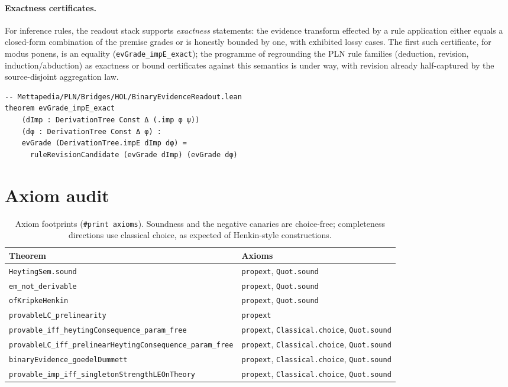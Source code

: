 \documentclass[11pt]{article}
\newcommand{\code}[1]{\texttt{#1}}
\theoremstyle{plain}
\theoremstyle{definition}
\begin{document}
\paragraph{Exactness certificates.}  For inference rules, the readout stack
supports \emph{exactness} statements: the evidence transform effected by a
rule application either equals a closed-form combination of the premise
grades or is honestly bounded by one, with exhibited lossy cases.  The first
such certificate, for modus ponens, is an equality
(\code{evGrade\_impE\_exact}); the programme of regrounding the PLN rule
families (deduction, revision, induction/abduction) as exactness or bound
certificates against this semantics is under way, with revision already
half-captured by the source-disjoint aggregation law.

\begin{lstlisting}
-- Mettapedia/PLN/Bridges/HOL/BinaryEvidenceReadout.lean
theorem evGrade_impE_exact
    (dImp : DerivationTree Const Δ (.imp φ ψ))
    (dφ : DerivationTree Const Δ φ) :
    evGrade (DerivationTree.impE dImp dφ) =
      ruleRevisionCandidate (evGrade dImp) (evGrade dφ)
\end{lstlisting}

\section{Axiom audit}\label{sec:audit}

\begin{table}[h]
\centering\footnotesize
\begin{tabular}{ll}
\toprule
Theorem & Axioms\\
\midrule
\code{HeytingSem.sound} & \code{propext}, \code{Quot.sound}\\
\code{em\_not\_derivable} & \code{propext}, \code{Quot.sound}\\
\code{ofKripkeHenkin} & \code{propext}, \code{Quot.sound}\\
\code{provableLC\_prelinearity} & \code{propext}\\
\code{provable\_iff\_heytingConsequence\_param\_free} &
  \code{propext}, \code{Classical.choice}, \code{Quot.sound}\\
\code{provableLC\_iff\_prelinearHeytingConsequence\_param\_free} &
  \code{propext}, \code{Classical.choice}, \code{Quot.sound}\\
\code{binaryEvidence\_goedelDummett} &
  \code{propext}, \code{Classical.choice}, \code{Quot.sound}\\
\code{provable\_imp\_iff\_singletonStrengthLEOnTheory} &
  \code{propext}, \code{Classical.choice}, \code{Quot.sound}\\
\bottomrule
\end{tabular}
\caption{Axiom footprints (\code{\#print axioms}).  Soundness and the
negative canaries are choice-free; completeness directions use classical
choice, as expected of Henkin-style constructions.}
\label{tab:audit}
\end{table}
\end{document}
